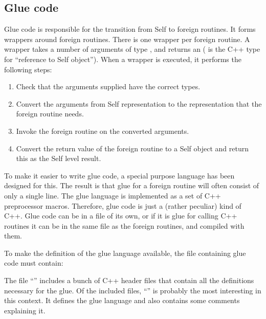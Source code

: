 \documentclass[letterpaper,10pt,english]{sphinxmanual}
\begin{document}

\subsection{Glue code}
\label{\detokenize{vmref:index-62}}\label{\detokenize{vmref:glue-code}}
Glue code is responsible for the transition from Self to foreign routines. It forms wrappers around
foreign routines. There is one wrapper per foreign routine. A wrapper takes a number of arguments
of type , and returns an  ( is the C++ type for “reference to Self object”). When a
wrapper is executed, it performs the following steps:
\begin{enumerate}
\item {} 
Check that the arguments supplied have the correct types.

\item {} 
Convert the arguments from Self representation to the representation that the foreign routine needs.

\item {} 
Invoke the foreign routine on the converted arguments.

\item {} 
Convert the return value of the foreign routine to a Self object and return this as the Self level result.

\end{enumerate}

To make it easier to write glue code, a special purpose language has been designed for this. The
result is that glue for a foreign routine will often consist of only a single line. The glue language is
implemented as a set of C++ preprocessor macros. Therefore, glue code is just a (rather peculiar)
kind of C++. Glue code can be in a file of its own, or \textendash{} if it is glue for calling C++ routines \textendash{} it can
be in the same file as the foreign routines, and compiled with them.

To make the definition of the glue language available, the file containing glue code must contain:

\begin{sphinxVerbatim}[commandchars=\\\{\}]
\end{sphinxVerbatim}

The file “” includes a bunch of C++ header files that contain all the definitions
necessary for the glue. Of the included files, “” is probably the most interesting in this
context. It defines the glue language and also contains some comments explaining it.
\end{document}
